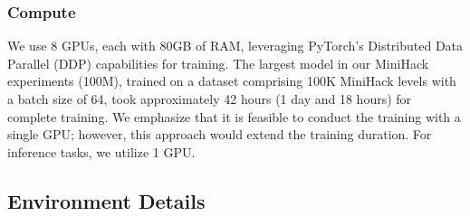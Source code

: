 \documentclass[]{fairmeta}
\begin{document}
\subsubsection{Compute} We use 8 GPUs, each with 80GB of RAM, leveraging PyTorch's Distributed Data Parallel (DDP) capabilities for training. The largest model in our MiniHack experiments (100M), trained on a dataset comprising 100K MiniHack levels with a batch size of 64, took approximately 42 hours (1 day and 18 hours) for complete training. We emphasize that it is feasible to conduct the training with a single GPU; however, this approach would extend the training duration. For inference tasks, we utilize 1 GPU.
\subsection{Environment Details}
\label{app:env_details}
\end{document}
